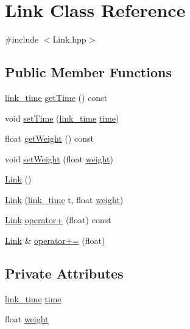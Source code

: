 \hypertarget{class_link}{\section{Link Class Reference}
\label{class_link}
}


{\ttfamily \#include $<$Link.\+hpp$>$}

\subsection*{Public Member Functions}
\begin{DoxyCompactItemize}
\item 
\hyperlink{_link_8hpp_aaf44f94a2cc67ec8ddd81004137e8369}{link\+\_\+time} \hyperlink{class_link_af3dac01ac8fb3c9d9637361bab37a8f7}{get\+Time} () const 
\item 
void \hyperlink{class_link_af8b4ae699e66876e9fe933b0d979838f}{set\+Time} (\hyperlink{_link_8hpp_aaf44f94a2cc67ec8ddd81004137e8369}{link\+\_\+time} \hyperlink{class_link_acb992140e3cf154c36fd94ab8184e00e}{time})
\item 
float \hyperlink{class_link_aaf7980526f4edf059b27602a7be82b2a}{get\+Weight} () const 
\item 
void \hyperlink{class_link_add219a5edb1c6a97ae46f5f1ab360a22}{set\+Weight} (float \hyperlink{class_link_a61f8b4a76aa028011dbe75affc1b44f7}{weight})
\item 
\hyperlink{class_link_a1918a8473cee40bbed17b8e926cb85d9}{Link} ()
\item 
\hyperlink{class_link_afc5d636eb34927773121560fcd9a7d99}{Link} (\hyperlink{_link_8hpp_aaf44f94a2cc67ec8ddd81004137e8369}{link\+\_\+time} t, float \hyperlink{class_link_a61f8b4a76aa028011dbe75affc1b44f7}{weight})
\item 
\hyperlink{class_link}{Link} \hyperlink{class_link_ae3cc4f9078e2f6f1b642667d49b9dc02}{operator+} (float) const 
\item 
\hyperlink{class_link}{Link} \& \hyperlink{class_link_a71e54bce5f5f7244144c7f7cf4b826a6}{operator+=} (float)
\end{DoxyCompactItemize}
\subsection*{Private Attributes}
\begin{DoxyCompactItemize}
\item 
\hyperlink{_link_8hpp_aaf44f94a2cc67ec8ddd81004137e8369}{link\+\_\+time} \hyperlink{class_link_acb992140e3cf154c36fd94ab8184e00e}{time}
\item 
float \hyperlink{class_link_a61f8b4a76aa028011dbe75affc1b44f7}{weight}
\end{DoxyCompactItemize}
